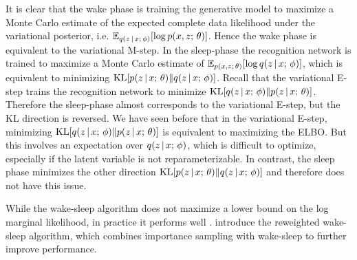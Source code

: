\documentclass{article}
\begin{document}
It is clear that the wake phase is training the generative model to maximize a Monte Carlo estimate of the expected complete data likelihood under the variational posterior, i.e. $\mathbb{E}_{q(z \,|\, x ; \, \phi)}[\log p(x, z ; \, \theta)]$. Hence the wake phase is equivalent to the variational M-step.
In the sleep-phase the recognition network is trained to maximize a Monte Carlo estimate of 
$\mathbb{E}_{p(x, z ; \, \theta)} [\log q(z \,|\, x ; \, \phi)]$, which is equivalent to minimizing
$\operatorname*{KL}[p(z \,|\, x ; \, \theta) \Vert q(z \,|\, x ; \, \phi)]$. Recall that the variational E-step
trains the recognition network to  minimize $\operatorname*{KL}[q(z \,|\, x ; \, \phi) \Vert p(z \,|\, x ; \, \theta)]$. Therefore the sleep-phase almost corresponds to the variational E-step, but the KL direction is reversed.
We have seen before that in the variational E-step, minimizing  $\operatorname*{KL}[q(z \,|\, x ; \, \phi) \Vert p(z \,|\, x ; \, \theta)]$ is equivalent to maximizing the ELBO. But this involves an expectation over $q(z \,|\, x ; \, \phi)$, which is difficult to optimize, especially if the latent variable is not reparameterizable. In contrast, the sleep phase minimizes the other direction
$\operatorname*{KL}[p(z \,|\, x ; \, \theta) \Vert q(z \,|\, x ; \, \phi)]$ and therefore does not have this issue.

While the wake-sleep algorithm does not maximize a lower bound on the log marginal likelihood, in practice
it performs well \citep{hinton2006,Ba2015,Mnih2016,le2018rws}. \cite{bornschein2015} introduce the reweighted wake-sleep algorithm, which combines importance sampling with wake-sleep to further improve performance.
\end{document}
